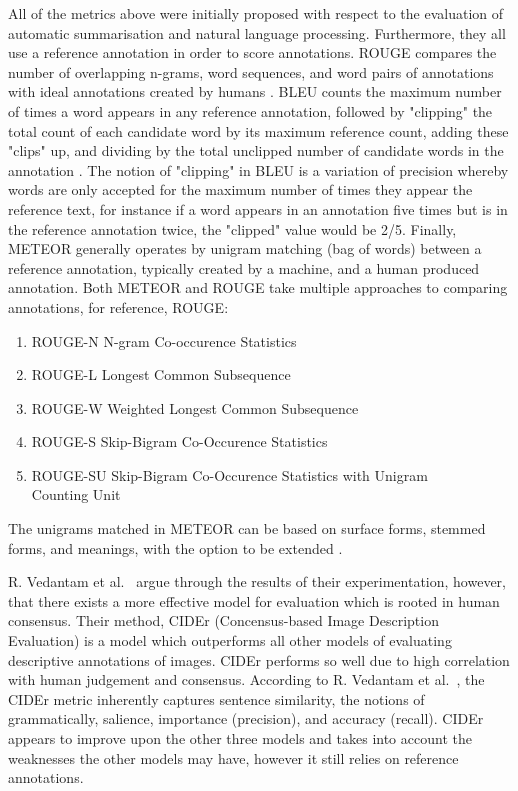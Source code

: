 All of the metrics above were initially proposed with respect to the evaluation of automatic summarisation and natural language processing. Furthermore, they all use a reference annotation in order to score annotations. ROUGE compares the number of overlapping n-grams, word sequences, and word pairs of annotations with ideal annotations created by humans \cite{lin2004rouge}. BLEU counts the maximum number of times a word appears in any reference annotation, followed by "clipping" the total count of each candidate word by its maximum reference count, adding these "clips" up, and dividing by the total unclipped number of candidate words in the annotation \cite{papineni2002bleu}. The notion of "clipping" in BLEU is a variation of precision whereby words are only accepted for the maximum number of times they appear the reference text, for instance if a word appears in an annotation five times but is in the reference annotation twice, the "clipped" value would be 2/5. Finally, METEOR generally operates by unigram matching (bag of words) between a reference annotation, typically created by a machine, and a human produced annotation. Both METEOR and ROUGE take multiple approaches to comparing annotations, for reference, ROUGE:
\begin{enumerate}
    \item ROUGE-N N-gram Co-occurence Statistics
    \item ROUGE-L Longest Common Subsequence
    \item ROUGE-W Weighted Longest Common Subsequence
    \item ROUGE-S Skip-Bigram Co-Occurence Statistics
    \item ROUGE-SU Skip-Bigram Co-Occurence Statistics with Unigram\\ Counting Unit
\end{enumerate}
The unigrams matched in METEOR can be based on surface forms, stemmed forms, and meanings, with the option to be extended \cite{elliott2013image}.

R. Vedantam et al.~\cite{vedantam2015cider} argue through the results of their experimentation, however, that there exists a more effective model for evaluation which is rooted in human consensus. Their method, CIDEr (Concensus-based Image Description Evaluation) is a model which outperforms all other models of evaluating descriptive annotations of images. CIDEr performs so well due to high correlation with human judgement and consensus. According to R. Vedantam et al.~\cite{vedantam2015cider}, the CIDEr metric inherently captures sentence similarity, the notions of grammatically, salience, importance (precision), and accuracy (recall). CIDEr appears to improve upon the other three models and takes into account the weaknesses the other models may have, however it still relies on reference annotations.

